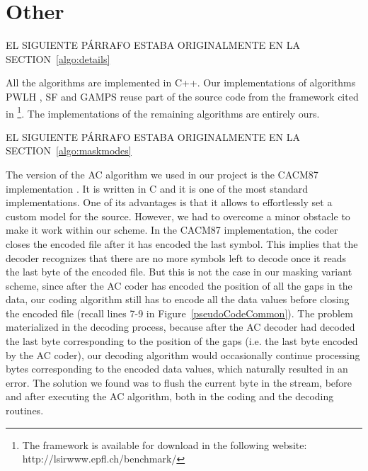 
\clearpage

\section{Other}
\label{algo:other}


EL SIGUIENTE PÁRRAFO ESTABA ORIGINALMENTE EN LA SECTION~\ref{algo:details}


All the algorithms are implemented in C++. Our implementations of algorithms PWLH \cite{coder:pwlh}, SF \cite{coder:sf} and GAMPS \cite{coder:gamps} reuse part of the source code from the framework cited in \cite{AnEva2013}\footnote{The framework is available for download in the following website: http://lsirwww.epfl.ch/benchmark/}. The implementations of the remaining algorithms \cite{coder:pca, coder:apca, coder:ca, coder:fr} are entirely ours. 


EL SIGUIENTE PÁRRAFO ESTABA ORIGINALMENTE EN LA SECTION~\ref{algo:maskmodes}


The version of the AC algorithm we used in our project is the CACM87 implementation \cite{arcodingcomp, ac1}. It is written in C and it is one of the most standard implementations. One of its advantages is that it allows to effortlessly set a custom model for the source. However, we had to overcome a minor obstacle to make it work within our scheme. In the CACM87 implementation, the coder closes the encoded file after it has encoded the last symbol. This implies that the decoder recognizes that there are no more symbols left to decode once it reads the last byte of the encoded file. But this is not the case in our masking variant scheme, since after the AC coder has encoded the position of all the gaps in the data, our coding algorithm still has to encode all the data values before closing the encoded file (recall lines 7-9 in Figure~\ref{pseudoCodeCommon}). The problem materialized in the decoding process, because after the AC decoder had decoded the last byte corresponding to the position of the gaps (i.e. the last byte encoded by the AC coder), our decoding algorithm would occasionally continue processing bytes corresponding to the encoded data values, which naturally resulted in an error. The solution we found was to flush the current byte in the stream, before and after executing the AC algorithm, both in the coding and the decoding routines.
